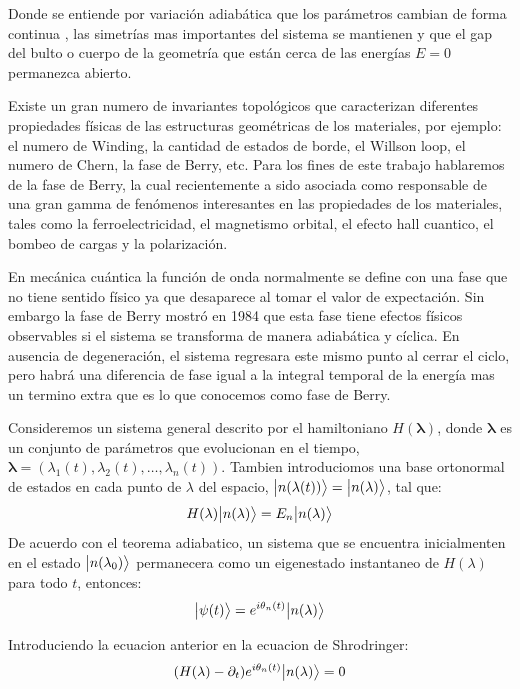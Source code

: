 Donde se entiende por variación adiabática que los parámetros cambian de forma continua , las simetrías mas importantes del sistema se mantienen y que el gap del bulto o cuerpo de la geometría que están cerca de las energías $E=0$ permanezca abierto.

Existe un gran numero de invariantes topológicos que caracterizan diferentes propiedades físicas de las estructuras geométricas de los materiales, por ejemplo: el numero de Winding, la cantidad de estados de borde, el Willson loop, el numero de Chern, la fase de Berry, etc. Para los fines de este trabajo hablaremos de la fase de Berry, la cual recientemente a sido asociada como responsable de una gran gamma de fenómenos interesantes en las propiedades de los materiales, tales como la ferroelectricidad, el magnetismo orbital, el efecto hall cuantico, el bombeo de cargas y la polarización.

En mecánica cuántica la función de onda normalmente se define con una fase que no tiene sentido físico ya que desaparece al tomar el valor de expectación. Sin embargo la fase de Berry mostró en 1984 que esta fase tiene efectos físicos observables si el sistema se transforma de manera adiabática y cíclica. En ausencia de degeneración, el sistema regresara este mismo punto al cerrar el ciclo, pero habrá una diferencia de fase igual a la integral temporal de la energía mas un termino extra que es lo que conocemos como fase de Berry.

Consideremos un sistema general descrito por el hamiltoniano $H(\mathbf{\lambda})$, donde $\mathbf{\lambda}$ es un conjunto de parámetros que evolucionan en el tiempo, $\mathbf{\lambda} = \left( \lambda_1(t), \lambda_2(t),\dots, \lambda_n(t)\right)$. Tambien introduciomos una base ortonormal de estados en cada punto de $\lambda$ del espacio, $\big |{n(\lambda(t))}\big \rangle = \big |{n(\lambda)}\big \rangle$, tal que:
\begin{equation}
    H(\lambda) \big |{n(\lambda)}\big \rangle =  E_n\big |{n(\lambda)}\big \rangle
\end{equation}
De acuerdo con el teorema adiabatico, un sistema que se encuentra inicialmenten en el estado $\big |{n(\lambda_0)}\big \rangle$ permanecera como un eigenestado instantaneo de $H(\lambda)$ para todo $t$, entonces:
\begin{align}
    \big |{\psi(t)}\big \rangle =  e^{i\theta_n(t)}\big |{n(\lambda)}\big \rangle
\end{align}

Introduciendo la ecuacion anterior en la ecuacion de Shrodringer:
\begin{align}
    (H(\lambda) - \partial_t) e^{i\theta_n(t)}\big |{n(\lambda)}\big \rangle =  0
\end{align}

